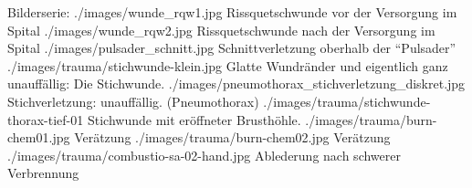 \begin{PictureSeriesWide}{}{Bilderserie: }
{./images/wunde_rqw1.jpg}
{Rissquetschwunde
vor der Versorgung im Spital
}
{./images/wunde_rqw2.jpg}
{Rissquetschwunde
nach der Versorgung im Spital
}
{./images/pulsader_schnitt.jpg}
{Schnittverletzung
oberhalb der \enquote{Pulsader}
}
{}
{}
{./images/trauma/stichwunde-klein.jpg}
{Glatte
Wundränder und eigentlich ganz unauffällig: Die Stichwunde.
}
{./images/pneumothorax_stichverletzung_diskret.jpg}
{Stichverletzung:
unauffällig. 
(Pneumothorax)}
{./images/trauma/stichwunde-thorax-tief-01}
{Stichwunde
mit eröffneter Brusthöhle.
}
{}
{}
{./images/trauma/burn-chem01.jpg}
{Verätzung
}
{./images/trauma/burn-chem02.jpg}
{Verätzung
}
{./images/trauma/combustio-sa-02-hand.jpg}
{Ablederung nach schwerer
Verbrennung
}
{}
{}
\end{PictureSeriesWide}




